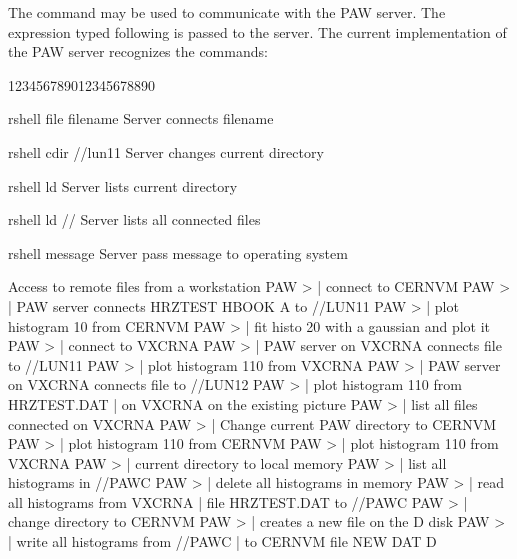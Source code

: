 The  command may be used to communicate with the PAW server.
The expression typed following  is passed to the server. The current
implementation of the PAW server recognizes the commands:
\begin{DLtt}{123456789012345678890}
\item[rshell file filename]Server connects filename
\item[rshell cdir //lun11] Server changes current directory
\item[rshell ld]           Server lists current directory
\item[rshell ld //]        Server lists all connected files
\item[rshell message]      Server pass message to operating system
\end{DLtt}
 
\begin{XMPt}{Access to remote files from a workstation}
PAW >                          | connect to CERNVM
PAW >              | PAW server connects HRZTEST HBOOK A to //LUN11
PAW >                          | plot histogram 10 from CERNVM
PAW >                         | fit histo 20 with a gaussian and plot it
PAW >                          | connect to VXCRNA
PAW >   | PAW server on VXCRNA connects file to //LUN11
PAW >                         | plot histogram 110 from VXCRNA
PAW >                | PAW server on VXCRNA connects file to //LUN12
PAW >                       | plot histogram 110 from HRZTEST.DAT
                                            | on VXCRNA on the existing picture
PAW >                           | list all files connected on VXCRNA
PAW >                          | Change current PAW directory to CERNVM
PAW >                         | plot histogram 110 from CERNVM
PAW >                | plot histogram 110 from VXCRNA
PAW >                            | current directory to local memory
PAW >                             | list all histograms in //PAWC
PAW >                         | delete all histograms in memory
PAW >                        | read all histograms from VXCRNA
                                            | file HRZTEST.DAT to //PAWC
PAW >                          | change directory to CERNVM
PAW >           | creates a new file on the D disk
PAW >                                | write all histograms from //PAWC
                                            | to CERNVM file NEW DAT D
\end{XMPt}
 

